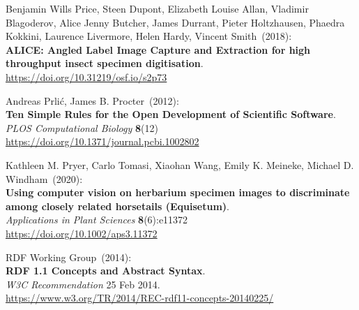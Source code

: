 \begin{thebibliography}{9}
Benjamin Wills Price, Steen Dupont, Elizabeth Louise Allan, Vladimir Blagoderov, Alice Jenny Butcher, James Durrant, Pieter Holtzhausen, Phaedra Kokkini, Laurence Livermore, Helen Hardy, Vincent Smith~(2018): \\
\textbf{ALICE: Angled Label Image Capture and Extraction
for high throughput insect specimen digitisation}.\\
\url{https://doi.org/10.31219/osf.io/s2p73}


Andreas Prlić, James B. Procter~(2012):\\
\textbf{Ten Simple Rules for the Open Development of Scientific Software}.\\
\emph{PLOS Computational Biology} \textbf{8}(12) \\
\url{https://doi.org/10.1371/journal.pcbi.1002802}

Kathleen M. Pryer, Carlo Tomasi, Xiaohan Wang, Emily K. Meineke, Michael D. Windham~(2020): \\
\textbf{Using computer vision on herbarium specimen images
to discriminate among closely related horsetails (Equisetum)}.\\
\emph{Applications in Plant Sciences} \textbf{8}(6):e11372\\
\url{https://doi.org/10.1002/aps3.11372}

RDF Working Group~(2014): \\
\textbf{RDF 1.1 Concepts and Abstract Syntax}.\\
\emph{W3C Recommendation} 25 Feb 2014.\\
\url{https://www.w3.org/TR/2014/REC-rdf11-concepts-20140225/}


\end{thebibliography}
